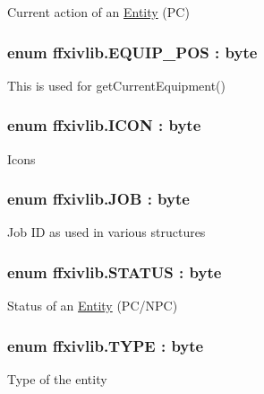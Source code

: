 Current action of an \hyperlink{classffxivlib_1_1_entity}{Entity} (P\-C) 

\hypertarget{namespaceffxivlib_a08bcc753fec0a3174d818ecaa25aec4f}{
\subsubsection[{E\-Q\-U\-I\-P\-\_\-\-P\-O\-S}]{\setlength{\rightskip}{0pt plus 5cm}enum {\bf ffxivlib.\-E\-Q\-U\-I\-P\-\_\-\-P\-O\-S} \-: byte}}\label{namespaceffxivlib_a08bcc753fec0a3174d818ecaa25aec4f}


This is used for get\-Current\-Equipment() 

\hypertarget{namespaceffxivlib_a3a6b3a65a3fc9ba42586b2ccc07e4aac}{
\subsubsection[{I\-C\-O\-N}]{\setlength{\rightskip}{0pt plus 5cm}enum {\bf ffxivlib.\-I\-C\-O\-N} \-: byte}}\label{namespaceffxivlib_a3a6b3a65a3fc9ba42586b2ccc07e4aac}


Icons 

\hypertarget{namespaceffxivlib_a7273810711af045adb7151580e025a86}{
\subsubsection[{J\-O\-B}]{\setlength{\rightskip}{0pt plus 5cm}enum {\bf ffxivlib.\-J\-O\-B} \-: byte}}\label{namespaceffxivlib_a7273810711af045adb7151580e025a86}


Job I\-D as used in various structures 

\hypertarget{namespaceffxivlib_a856915176aeab1f9b643c0243cb008ee}{
\subsubsection[{S\-T\-A\-T\-U\-S}]{\setlength{\rightskip}{0pt plus 5cm}enum {\bf ffxivlib.\-S\-T\-A\-T\-U\-S} \-: byte}}\label{namespaceffxivlib_a856915176aeab1f9b643c0243cb008ee}


Status of an \hyperlink{classffxivlib_1_1_entity}{Entity} (P\-C/\-N\-P\-C) 

\hypertarget{namespaceffxivlib_aaa4e86d1ea6dbc1661147e6616256e68}{
\subsubsection[{T\-Y\-P\-E}]{\setlength{\rightskip}{0pt plus 5cm}enum {\bf ffxivlib.\-T\-Y\-P\-E} \-: byte}}\label{namespaceffxivlib_aaa4e86d1ea6dbc1661147e6616256e68}


Type of the entity 

